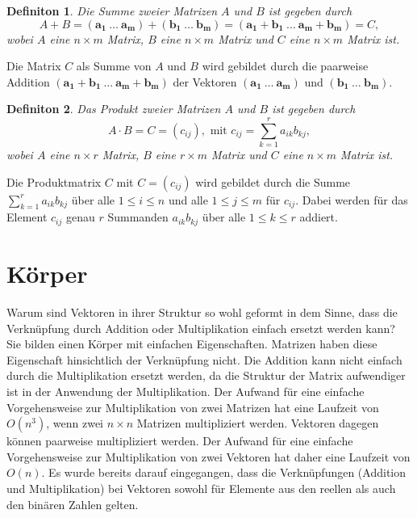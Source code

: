\documentclass[oneside]{scrbook}
\newtheorem{definition}{Definiton}[section]
\numberwithin{equation}{section}
\begin{document}
\begin{definition}
	Die Summe zweier Matrizen $A$ und $B$ ist gegeben durch 
	$$A + B = (\boldsymbol{a_1} \: \ldots \: \boldsymbol{a_m}) + (\boldsymbol{b_1} \: \ldots \: \boldsymbol{b_m}) = (\boldsymbol{a_1} + \boldsymbol{b_1} \: \ldots \: \boldsymbol{a_m} + \boldsymbol{b_m}) = C,$$ wobei $A$ eine $n \times m$ Matrix, $B$ eine $n \times m$ Matrix und $C$ eine $n \times m$ Matrix ist.
\end{definition}
Die Matrix $C$ als Summe von $A$ und $B$ wird gebildet durch die paarweise Addition $(\boldsymbol{a_1} + \boldsymbol{b_1} \: \ldots \: \boldsymbol{a_m} + \boldsymbol{b_m})$ der Vektoren $(\boldsymbol{a_1} \: \ldots \: \boldsymbol{a_m})$ und $(\boldsymbol{b_1} \: \ldots \: \boldsymbol{b_m})$.
\begin{definition}
	Das Produkt zweier Matrizen $A$ und $B$ ist gegeben durch 
	$$A \cdot B = C = (c_{ij}), \text{ mit } c_{ij} = \sum_{k=1}^{r}a_{ik}b_{kj},$$ wobei $A$ eine $n \times r$ Matrix, $B$ eine $r \times m$ Matrix und $C$ eine $n \times m$ Matrix ist.
\end{definition}
Die Produktmatrix $C$ mit $C = (c_{ij})$ wird gebildet durch die Summe $\sum_{k=1}^{r}a_{ik}b_{kj}$ über alle $1 \leq i \leq n$ und alle $1 \leq j \leq m$ für $c_{ij}$. Dabei werden für das Element $c_{ij}$ genau $r$ Summanden $a_{ik}b_{kj}$ über alle $1 \leq k \leq r$ addiert.

\section{Körper}
Warum sind Vektoren in ihrer Struktur so wohl geformt in dem Sinne, dass die Verknüpfung durch Addition oder Multiplikation einfach ersetzt werden kann? Sie bilden einen Körper mit einfachen Eigenschaften. Matrizen haben diese Eigenschaft hinsichtlich der Verknüpfung nicht. Die Addition kann nicht einfach durch die Multiplikation ersetzt werden, da die Struktur der Matrix aufwendiger ist in der Anwendung der Multiplikation. Der Aufwand für eine einfache Vorgehensweise zur Multiplikation von zwei Matrizen hat eine Laufzeit von $O(n^3)$, wenn zwei $n \times n$ Matrizen multipliziert werden. Vektoren dagegen können paarweise multipliziert werden. Der Aufwand für eine einfache Vorgehensweise zur Multiplikation von zwei Vektoren hat daher eine Laufzeit von $O(n)$. Es wurde bereits darauf eingegangen, dass die Verknüpfungen (Addition und Multiplikation) bei Vektoren sowohl für Elemente aus den reellen als auch den binären Zahlen gelten.
\end{document}
